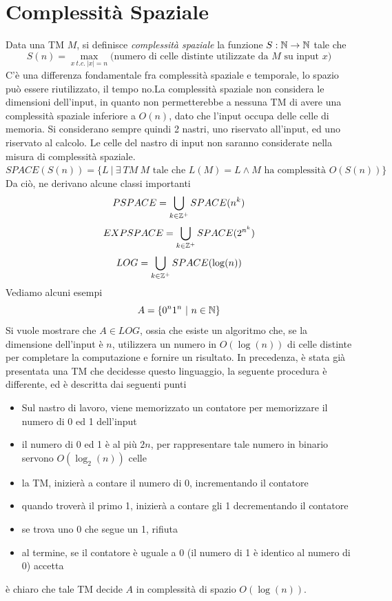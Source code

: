 \documentclass[10pt, letterpaper]{report}
\begin{document}
\chapter{Complessità Spaziale}
Data una TM $M$, si definisce \textit{complessità spaziale} la funzione $S:{\mathbb N}\rightarrow {\mathbb N}$ tale che 
$$ S(n)=\max_{x \ t.c. \ |x|=n}\Big(
\text{numero di celle distinte utilizzate da $M$ su input $x$}    
\Big) $$
C'è una differenza fondamentale fra complessità spaziale e temporale, lo spazio può essere riutilizzato, il tempo no.\acc  La complessità spaziale non considera le dimensioni dell'input, in quanto non permetterebbe a nessuna TM di avere una complessità spaziale inferiore a $O(n)$, dato che l'input occupa delle celle di memoria. Si considerano sempre quindi 2 nastri, uno riservato all'input, ed uno riservato al calcolo. Le celle del nastro di input non saranno considerate nella misura di complessità spaziale.\acc 
{} $SPACE(S(n))=\{ L \ | \ \exists \ TM \ M \text{ tale che }L(M)=L \land  M \text{ ha complessità }O(S(n))\}$
Da ciò, ne derivano alcune classi importanti 
$$ PSPACE = \bigcup_{k\in {\mathbb Z}^+}SPACE(n^k)$$
$$ EXPSPACE = \bigcup_{k\in {\mathbb Z}^+}SPACE(2^{n^k})$$
$$ LOG = \bigcup_{k\in {\mathbb Z}^+}SPACE(\log(n))$$
Vediamo alcuni esempi 
$$ A=\{0^n1^n \ | \ n\in {\mathbb N}\}$$
Si vuole mostrare che $A\in LOG$, ossia che esiste un algoritmo che, se la dimensione dell'input è $n$, utilizzera un numero in $O(\log(n))$ di celle distinte per completare la computazione e fornire un risultato.\acc 
In precedenza, è stata già presentata una TM che decidesse questo linguaggio, la seguente procedura è differente, ed è descritta dai seguenti punti\begin{itemize}
    \item Sul nastro di lavoro, viene memorizzato un contatore per memorizzare il numero di 0 ed 1 dell'input 
    \item il numero di 0 ed 1 è al più $2n$, per rappresentare tale numero in binario servono $O(\log_2(n))$ celle 
    \item la TM, inizierà a contare il numero di 0, incrementando il contatore 
    \item quando troverà il primo 1, inizierà a contare gli 1 decrementando il contatore 
    \item se trova uno 0 che segue un 1, rifiuta 
    \item al termine, se il contatore è uguale a 0 (il numero di 1 è identico al numero di 0) accetta 
\end{itemize}
è chiaro che tale TM decide $A$ in complessità di spazio $O(\log(n))$.\acc 
\end{document}
